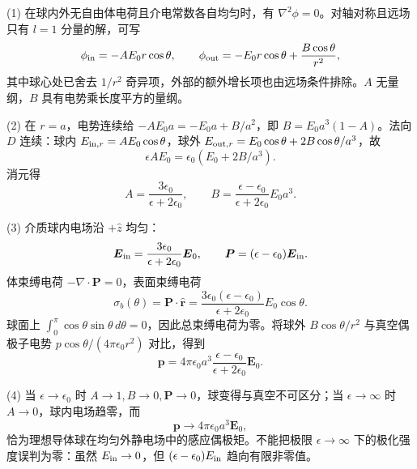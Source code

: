 (1) 在球内外无自由体电荷且介电常数各自均匀时，有 \(\nabla^2\phi=0\)。对轴对称且远场只有 \(l=1\) 分量的解，可写
\[
\phi_{\rm in}=-AE_0r\cos\theta,\qquad
\phi_{\rm out}=-E_0r\cos\theta+\frac{B\cos\theta}{r^2},
\]
其中球心处已舍去 \(1/r^2\) 奇异项，外部的额外增长项也由远场条件排除。\(A\) 无量纲，\(B\) 具有电势乘长度平方的量纲。

(2) 在 \(r=a\)，电势连续给 \(-AE_0a=-E_0a+B/a^2\)，即 \(B=E_0a^3(1-A)\)。法向 \(D\) 连续：球内 \(E_{{\rm in},r}=AE_0\cos\theta\)，球外 \(E_{{\rm out},r}=E_0\cos\theta+2B\cos\theta/a^3\)，故
\[
\epsilon A E_0=\epsilon_0(E_0+2B/a^3).
\]
消元得
\[
A=\frac{3\epsilon_0}{\epsilon+2\epsilon_0},\qquad
B=\frac{\epsilon-\epsilon_0}{\epsilon+2\epsilon_0}E_0a^3.
\]

(3) 介质球内电场沿 \(+\hat z\) 均匀：
\[
\boldsymbol E_{\rm in}=\frac{3\epsilon_0}{\epsilon+2\epsilon_0}\boldsymbol E_0,\qquad
\boldsymbol P=(\epsilon-\epsilon_0)\boldsymbol E_{\rm in}.
\]
体束缚电荷 \(-\nabla\cdot\boldsymbol P=0\)，表面束缚电荷
\[
\sigma_b(\theta)=\boldsymbol P\cdot\hat{\boldsymbol r}
=\frac{3\epsilon_0(\epsilon-\epsilon_0)}{\epsilon+2\epsilon_0}E_0\cos\theta.
\]
球面上 \(\int_0^\pi\cos\theta\sin\theta\,d\theta=0\)，因此总束缚电荷为零。将球外 \(B\cos\theta/r^2\) 与真空偶极子电势 \(p\cos\theta/(4\pi\epsilon_0r^2)\) 对比，得到
\[
\boldsymbol p=4\pi\epsilon_0a^3\frac{\epsilon-\epsilon_0}{\epsilon+2\epsilon_0}\boldsymbol E_0.
\]

(4) 当 \(\epsilon\to\epsilon_0\) 时 \(A\to1,B\to0,\boldsymbol P\to0\)，球变得与真空不可区分；当 \(\epsilon\to\infty\) 时 \(A\to0\)，球内电场趋零，而
\[
\boldsymbol p\to4\pi\epsilon_0a^3\boldsymbol E_0,
\]
恰为理想导体球在均匀外静电场中的感应偶极矩。不能把极限 \(\epsilon\to\infty\) 下的极化强度误判为零：虽然 \(E_{\rm in}\to0\)，但 \((\epsilon-\epsilon_0)E_{\rm in}\) 趋向有限非零值。
